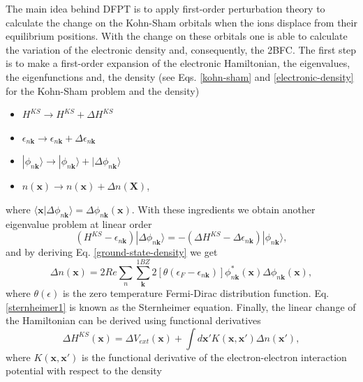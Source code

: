 The main idea behind DFPT is to apply first-order perturbation theory to calculate the change on the Kohn-Sham orbitals when the ions displace from their equilibrium positions. With the change on these 
orbitals one is able to calculate the variation of the electronic density and, consequently, the 2BFC. The first step is to make a first-order expansion of the electronic Hamiltonian, the eigenvalues, 
the eigenfunctions and, the density (see Eqs. \ref{kohn-sham} and \ref{electronic-density} for the Kohn-Sham problem and the density)
\begin{itemize}
 \item $H^{KS} \rightarrow H^{KS}+\Delta H^{KS}$
 \item $\epsilon_{n\mathbf{k}} \rightarrow \epsilon_{n\mathbf{k}} + \Delta\epsilon_{n\mathbf{k}}$
 \item $|\phi_{n\mathbf{k}}\rangle \rightarrow |\phi_{n\mathbf{k}}\rangle + |\Delta\phi_{n\mathbf{k}}\rangle$ 
 \item $n(\mathbf{x}) \rightarrow n(\mathbf{x}) + \Delta n(\mathbf{X})$,
\end{itemize}
where $\langle\mathbf{x}|\Delta\phi_{n\mathbf{k}}\rangle=\Delta\phi_{n\mathbf{k}}(\mathbf{x})$. With these ingredients we obtain another eigenvalue problem at linear order 
\begin{equation}
 \label{sternheimer1}
 (H^{KS}-\epsilon_{n\mathbf{k}})|\Delta\phi_{n\mathbf{k}}\rangle=-(\Delta H^{KS}-\Delta\epsilon_{n\mathbf{k}})|\phi_{n\mathbf{k}}\rangle,
\end{equation} 
and by deriving Eq. \ref{ground-state-density} we get
\begin{equation}
 \label{sternheimer2}
 \Delta n(\mathbf{x})=2Re\sum_{n}\sum_{\mathbf{k}}^{1BZ}2[\theta(\epsilon_{F}-\epsilon_{n\mathbf{k}})]\phi_{n\mathbf{k}}^{*}(\mathbf{x})\Delta\phi_{n\mathbf{k}}(\mathbf{x}),
\end{equation}
where $\theta(\epsilon)$ is the zero temperature Fermi-Dirac distribution function. Eq. \ref{sternheimer1} is known as the Sternheimer equation\cite{sternheimer1954electronic}. Finally, the linear change of 
the Hamiltonian can be derived using functional derivatives
\begin{equation}
 \label{sternheimer3}
 \Delta H^{KS}(\mathbf{x})=\Delta V_{ext}(\mathbf{x})+\int{d\mathbf{x}'K(\mathbf{x},\mathbf{x}')\Delta n(\mathbf{x}')},
\end{equation} 
where $K(\mathbf{x},\mathbf{x}')$ is the functional derivative of the electron-electron interaction potential with respect to the density
